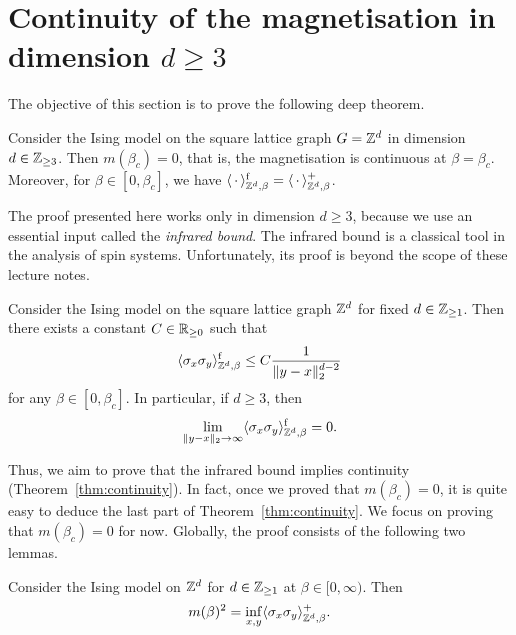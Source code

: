 \section{Continuity of the magnetisation in dimension $d\geq 3$}

The objective of this section is to prove the following deep theorem.

\begin{theorem}
    \label{thm:continuity}
    Consider the Ising model on the square lattice graph $G=\mathbb Z^d$
    in dimension $d\in\mathbb Z_{\geq 3}$.
    Then $m(\beta_c)=0$,
    that is, the magnetisation is continuous at $\beta=\beta_c$.
    Moreover, for $\beta\in[0,\beta_c]$,
    we have $\langle\,\cdot\,\rangle^{\operatorname{f}}_{\mathbb Z^d,\beta}=\langle\,\cdot\,\rangle^+_{\mathbb Z^d,\beta}$.
\end{theorem}

The proof presented here works only in dimension $d\geq 3$,
because we use an essential input called the \emph{infrared bound}.
The infrared bound is a classical tool in the analysis of spin systems.
Unfortunately, its proof is beyond the scope of these lecture notes.

\begin{theorem}
    Consider the Ising model on the square lattice graph $\mathbb Z^d$ for fixed $d\in\mathbb Z_{\geq 1}$.
    Then there exists a constant $C\in\mathbb R_{\geq 0}$ such that
    \[
        \langle\sigma_x\sigma_y\rangle_{\mathbb Z^d,\beta}^{\operatorname{f}}
        \leq C\frac1{\|y-x\|_2^{d-2}}
    \]
    for any $\beta\in[0,\beta_c]$.
    In particular, if $d\geq 3$,
    then
    \begin{equation}
        \lim_{\|y-x\|_2\to\infty}\langle\sigma_x\sigma_y\rangle_{\mathbb Z^d,\beta}^{\operatorname{f}}=0.
    \end{equation}    
\end{theorem}

Thus, we aim to prove that the infrared bound implies continuity (Theorem~\ref{thm:continuity}).
In fact, once we proved that $m(\beta_c)=0$,
it is quite easy to deduce the last part of Theorem~\ref{thm:continuity}.
We focus on proving that $m(\beta_c)=0$ for now.
Globally, the proof consists of the following two lemmas.

\begin{lemma}
    Consider the Ising model on $\mathbb Z^d$ for $d\in\mathbb Z_{\geq 1}$ at $\beta\in[0,\infty)$.
    Then
    \[
        m(\beta)^2=\inf_{x,y}\langle\sigma_x\sigma_y\rangle_{\mathbb Z^d,\beta}^+.
    \]
\end{lemma}

